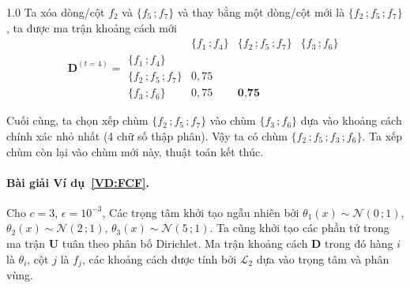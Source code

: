 \documentclass[a4paper,oneside]{book} %
\theoremstyle{plain}
\theoremstyle{plain}
\theoremstyle{nonumberplain}
\begin{document}
\begin{spacing}{1.0}
Ta xóa dòng/cột $f_2$ và $\{f_5\,;f_7\}$ và thay bằng một dòng/cột mới là $\{f_2\,;f_5\,;f_7\}$, ta được ma trận khoảng cách mới
$$
\bm D^{(t=4)} =
\begin{array}{c|ccc}
	& \{f_1\,;f_4\} & \{f_2\,;f_5\,;f_7\} & \{f_3\,;f_6\} \\
	\hline
	\{f_1\,;f_4\}        &         &        &        \\
	\{f_2\,;f_5\,;f_7\}    &0{,}75 &        &        \\
	\{f_3\,;f_6\}        & 0{,}75  & \textbf{0{,}75}&        
\end{array}
$$

Cuối cùng, ta chọn xếp chùm $\{f_2\,;f_5\,;f_7\}$  vào chùm $\{f_3\,;f_6\}$ dựa vào khoảng cách chính xác nhỏ nhất (4 chữ số thập phân). Vậy ta có chùm $\{f_2\,;f_5\,;f_3\,;f_6\}$. Ta xếp chùm còn lại vào chùm mới này, thuật toán kết thúc. 




\paragraph{Bài giải Ví dụ~\ref{VD:FCF}.}
Cho $c=3$, $\epsilon=10^{-3}$, Các trọng tâm khởi tạo ngẫu nhiên bởi
$\theta_1(x)\sim\mathcal N(0\,;1)$, 
$\theta_2(x)\sim\mathcal N(2\,;1)$, 
$\theta_3(x)\sim\mathcal N(5\,;1)$.
 Ta cũng khởi tạo các phần tử trong ma trận $\bm U$ tuân theo phân bố Dirichlet. 
Ma trận khoảng cách $\bm D$ trong đó hàng $i$ là $\theta_i$, cột $j$ là $f_j$, các khoảng cách được tính bởi $\mathcal{L}_2$ dựa vào trọng tâm và phân vùng.


\end{spacing}
\end{document}
